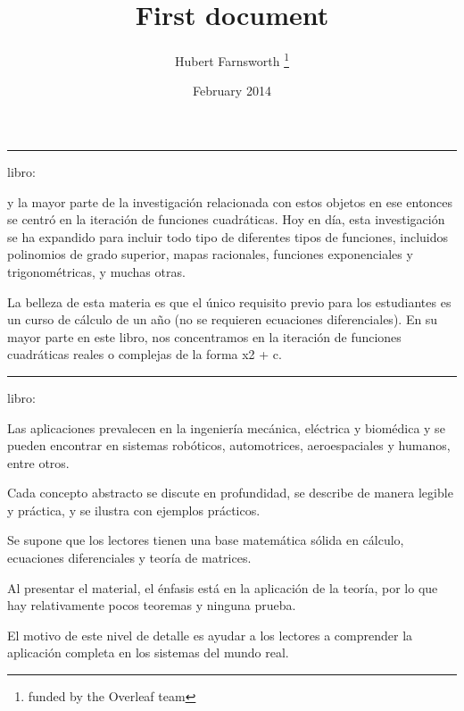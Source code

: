 \documentclass[12pt, letterpaper, twoside]{article}
\title{First document}
\author{Hubert Farnsworth \thanks{funded by the Overleaf team}}
\date{February 2014}
\begin{document}
\begin{titlepage}
\maketitle
\end{titlepage}


\hrule

\hfill


libro: \cite{Devaney}

\hfill

y la mayor parte de la investigación relacionada con estos objetos en ese entonces se centró en la iteración de funciones cuadráticas. 
Hoy en día, esta investigación se ha expandido para incluir todo tipo de diferentes tipos de funciones, incluidos polinomios de grado 
superior, mapas racionales, funciones exponenciales y trigonométricas, y muchas otras.



\hfill

La belleza de esta materia es que el único requisito previo para los estudiantes es un curso de cálculo de un año (no se requieren ecuaciones diferenciales). En su mayor parte en este libro, nos concentramos en la iteración de funciones cuadráticas reales o complejas de la forma x2 + c. 

\hfill

\hrule

\hfill


libro: \cite{MELLODGE:2016}

 Las aplicaciones prevalecen en la ingeniería mecánica, eléctrica y biomédica y se pueden encontrar en sistemas robóticos, automotrices, aeroespaciales y humanos, entre otros.


\hfill

Cada concepto abstracto se discute en profundidad, se describe de manera legible y práctica, y se ilustra con ejemplos prácticos.

\hfill

Se supone que los lectores tienen una base matemática sólida en cálculo, ecuaciones diferenciales y teoría de matrices.

Al presentar el material, el énfasis está en la aplicación de la teoría, por lo que hay relativamente pocos teoremas y ninguna prueba. 

\hfill

El motivo de este nivel de detalle es ayudar a los lectores a comprender la aplicación completa en los sistemas del mundo real.
\end{document}
